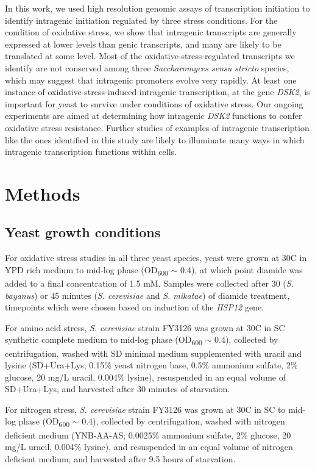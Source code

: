 In this work, we used high resolution genomic assays of transcription initiation to identify intragenic initiation regulated by three stress conditions.
For the condition of oxidative stress, we show that intragenic transcripts are generally expressed at lower levels than genic transcripts, and many are likely to be translated at some level.
Most of the oxidative-stress-regulated transcripts we identify are not conserved among three \textit{Saccharomyces sensu stricto} species, which may suggest that intragenic promoters evolve very rapidly.
At least one instance of oxidative-stress-induced intragenic transcription, at the gene \textit{DSK2}, is important for yeast to survive under conditions of oxidative stress.
Our ongoing experiments are aimed at determining how intragenic \textit{DSK2} functions to confer oxidative stress resistance.
Further studies of examples of intragenic transcription like the ones identified in this study are likely to illuminate many ways in which intragenic transcription functions within cells.

\section{Methods}

\subsection{Yeast growth conditions}
\label{subsec:stress_growth_conditions}

For oxidative stress studies in all three yeast species, yeast were grown at 30\textdegree C in YPD rich medium to mid-log phase (OD\textsubscript{600} $\sim$ 0.4), at which point diamide was added to a final concentration of 1.5 mM.
Samples were collected after 30 (\textit{S. bayanus}) or 45 minutes (\textit{S. cerevisiae} and \textit{S. mikatae}) of diamide treatment, timepoints which were chosen based on induction of the \textit{HSP12} gene.

For amino acid stress, \textit{S. cerevisiae} strain FY3126 was grown at 30\textdegree C in SC synthetic complete medium to mid-log phase (OD\textsubscript{600} $\sim$ 0.4), collected by centrifugation, washed with SD minimal medium supplemented with uracil and lysine (SD+Ura+Lys; 0.15\% yeast nitrogen base, 0.5\% ammonium sulfate, 2\% glucose, 20 mg/L uracil, 0.004\% lysine), resuspended in an equal volume of SD+Ura+Lys, and harvested after 30 minutes of starvation.

For nitrogen stress, \textit{S. cerevisiae} strain FY3126 was grown at 30\textdegree C in SC to mid-log phase (OD\textsubscript{600} $\sim$ 0.4), collected by centrifugation, washed with nitrogen deficient medium (YNB-AA-AS; 0.0025\% ammonium sulfate, 2\% glucose, 20 mg/L uracil, 0.004\% lysine), and resuspended in an equal volume of nitrogen deficient medium, and harvested after 9.5 hours of starvation.

